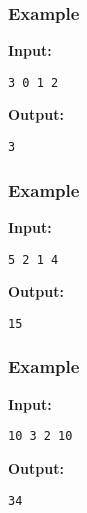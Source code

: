 \subsubsection{   Example  }

\textbf{    Input:   }
\begin{verbatim}
3 0 1 2\end{verbatim}

\textbf{    Output:   }
\begin{verbatim}
3\end{verbatim}

\subsubsection{   Example  }

\textbf{    Input:   }
\begin{verbatim}
5 2 1 4\end{verbatim}

\textbf{    Output:   }
\begin{verbatim}
15\end{verbatim}

\subsubsection{   Example  }

\textbf{    Input:   }
\begin{verbatim}
10 3 2 10\end{verbatim}

\textbf{    Output:   }
\begin{verbatim}
34\end{verbatim}

